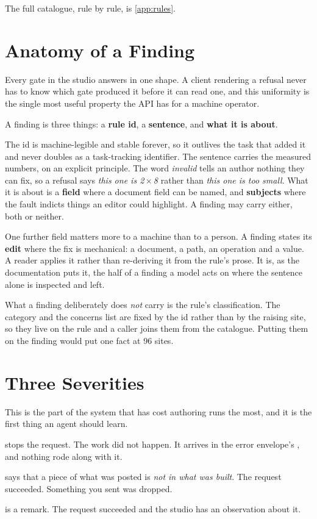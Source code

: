 The full catalogue, rule by rule, is \cref{app:rules}.

\section{Anatomy of a Finding}

Every gate in the studio answers in one shape. A client rendering a refusal never
has to know which gate produced it before it can read one, and this uniformity is
the single most useful property the API has for a machine operator.

A finding is three things: a \textbf{rule id}, a \textbf{sentence}, and
\textbf{what it is about}.

The id is machine-legible and stable forever, so it outlives the task that added
it and never doubles as a task-tracking identifier. The sentence carries the
measured numbers, on an explicit principle. The word \emph{invalid} tells an
author nothing they can fix, so a refusal says \emph{this one is
2\,$\times$\,8} rather than \emph{this one is too small}. What it is about is a \textbf{field} where a
document field can be named, and \textbf{subjects} where the fault indicts things
an editor could highlight. A finding may carry either, both or neither.

One further field matters more to a machine than to a person. A finding states its
\textbf{edit} where the fix is mechanical: a document, a path, an operation and a
value. A reader applies it rather than re-deriving it from the rule's prose. It
is, as the documentation puts it, the half of a finding a model acts on where the
sentence alone is inspected and left.

What a finding deliberately does \emph{not} carry is the rule's classification.
The category and the concerns list are fixed by the id rather than by the raising
site, so they live on the rule and a caller joins them from the catalogue. Putting
them on the finding would put one fact at 96 sites.

\section{Three Severities}

This is the part of the system that has cost authoring runs the most, and it is
the first thing an agent should learn.

\begin{description}[leftmargin=1.6em,style=nextline,itemsep=4pt]
  \item[A refusal] stops the request. The work did not happen. It arrives in the
    error envelope's , and nothing rode along with it.
  \item[A decline] says that a piece of what was posted is \emph{not in what was
    built}. The request succeeded. Something you sent was dropped.
  \item[A complaint] is a remark. The request succeeded and the studio has an
    observation about it.
\end{description}

